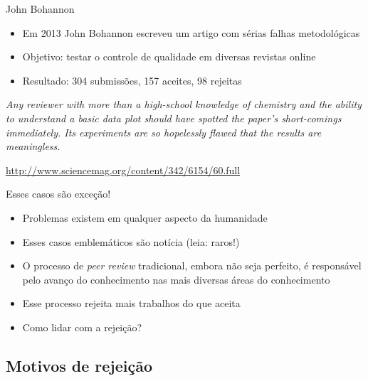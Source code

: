 \documentclass{beamer}
\begin{document}
\begin{frame}{John Bohannon}
  \begin{itemize}
    \footnotesize
  \item Em 2013 John Bohannon escreveu um artigo com sérias falhas
    metodológicas
    \medskip
  \item Objetivo: testar o controle de qualidade em diversas revistas
    online
    \medskip
  \item Resultado: 304 submissões, 157 aceites, 98 rejeitas
  \end{itemize}
    \bigskip
  \begin{block}{}
    \footnotesize
    \em
    Any reviewer with more than a high-school knowledge of chemistry
    and the ability to understand a basic data plot should have
    spotted the paper's short-comings immediately. Its experiments are
    so hopelessly flawed that the results are meaningless.
  \end{block}

  \vfill
  \tiny
  \hfill \url{http://www.sciencemag.org/content/342/6154/60.full}
\end{frame}

\begin{frame}{Esses casos são exceção!}
  \begin{itemize}
    \footnotesize
  \item Problemas existem em qualquer aspecto da humanidade
    \medskip
  \item Esses casos emblemáticos são notícia (leia: raros!)
    \medskip
  \item O processo de {\em peer review} tradicional, embora não seja
    perfeito, é responsável pelo avanço do conhecimento nas mais
    diversas áreas do conhecimento
    \medskip
  \item Esse processo rejeita mais trabalhos do que aceita
    \medskip
  \item Como lidar com a rejeição?
  \end{itemize}
\end{frame}

\subsection{Motivos de rejeição}
\end{document}
